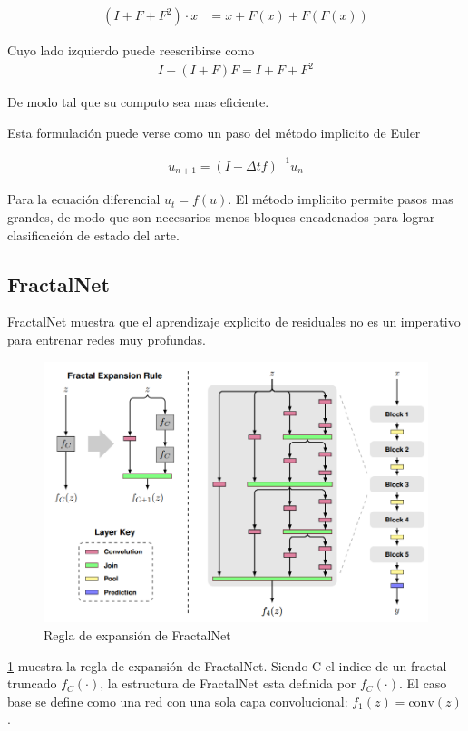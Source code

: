 \documentclass[titlepage,a4paper,oneside]{article}
\begin{document}
\begin{align}\label{PolyNet_ODE}
	(I + F + F^2) \cdot x &= x + F(x) + F(F(x))
\end{align}

Cuyo lado izquierdo puede reescribirse como
\begin{align}
	I + (I + F) F  = I + F + F^2
\end{align}

De modo tal que su computo sea mas eficiente.

Esta formulación puede verse como un paso del método implicito de Euler

\begin{align}
	u_{n+1} = (I -\Delta tf)^{-1}u_n
\end{align}

Para la ecuación diferencial $u_t = f(u)$. El método implicito permite pasos mas grandes, de modo que son necesarios menos bloques encadenados para lograr clasificación de estado del arte.

\subsection{FractalNet}
FractalNet \cite{larsson2017fractalnet} muestra que el aprendizaje explicito de residuales no es un imperativo para entrenar redes muy profundas.

\begin{figure}[H]
\centering
\includegraphics[width=\textwidth]{images/fractal_expansion.png}
\caption{Regla de expansión de FractalNet}
\label{fractal_expansion}
\end{figure}

\ref{fractal_expansion} muestra la regla de expansión de FractalNet. Siendo C el indice de un fractal truncado $f_C(\cdot)$, la estructura de FractalNet esta definida por $f_C(\cdot)$. El caso base se define como una red con una sola capa convolucional: $f_1(z) = \text{conv}(z)$.
\end{document}
